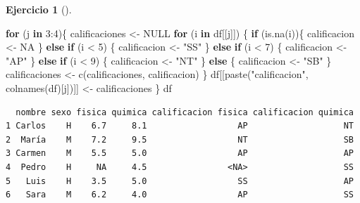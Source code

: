 \documentclass[
  a4paper,
]{scrreport}
\newenvironment{Shaded}{\begin{snugshade}}{\end{snugshade}}
\newcommand{\ConstantTok}[1]{\textcolor[rgb]{0.56,0.35,0.01}{#1}}
\newcommand{\ControlFlowTok}[1]{\textcolor[rgb]{0.00,0.23,0.31}{\textbf{#1}}}
\newcommand{\DecValTok}[1]{\textcolor[rgb]{0.68,0.00,0.00}{#1}}
\newcommand{\FunctionTok}[1]{\textcolor[rgb]{0.28,0.35,0.67}{#1}}
\newcommand{\NormalTok}[1]{\textcolor[rgb]{0.00,0.23,0.31}{#1}}
\newcommand{\OtherTok}[1]{\textcolor[rgb]{0.00,0.23,0.31}{#1}}
\newcommand{\SpecialCharTok}[1]{\textcolor[rgb]{0.37,0.37,0.37}{#1}}
\newcommand{\StringTok}[1]{\textcolor[rgb]{0.13,0.47,0.30}{#1}}
\theoremstyle{definition}
\newtheorem{exercise}{Ejercicio}[chapter]
\theoremstyle{definition}
\theoremstyle{remark}
\begin{document}
\begin{exercise}[]
\begin{enumerate}
\begin{tcolorbox}
\begin{Shaded}
\begin{Highlighting}[]
\ControlFlowTok{for}\NormalTok{ (j }\ControlFlowTok{in} \DecValTok{3}\SpecialCharTok{:}\DecValTok{4}\NormalTok{)\{}
\NormalTok{  calificaciones }\OtherTok{\textless{}{-}} \ConstantTok{NULL}
  \ControlFlowTok{for}\NormalTok{ (i }\ControlFlowTok{in}\NormalTok{ df[[j]]) \{}
    \ControlFlowTok{if}\NormalTok{ (}\FunctionTok{is.na}\NormalTok{(i))\{}
\NormalTok{      calificacion }\OtherTok{\textless{}{-}} \ConstantTok{NA} 
\NormalTok{    \} }\ControlFlowTok{else} \ControlFlowTok{if}\NormalTok{ (i }\SpecialCharTok{\textless{}} \DecValTok{5}\NormalTok{) \{}
\NormalTok{      calificacion }\OtherTok{\textless{}{-}} \StringTok{"SS"}
\NormalTok{    \} }\ControlFlowTok{else} \ControlFlowTok{if}\NormalTok{ (i }\SpecialCharTok{\textless{}} \DecValTok{7}\NormalTok{) \{}
\NormalTok{      calificacion }\OtherTok{\textless{}{-}} \StringTok{"AP"}
\NormalTok{    \} }\ControlFlowTok{else} \ControlFlowTok{if}\NormalTok{ (i }\SpecialCharTok{\textless{}} \DecValTok{9}\NormalTok{) \{}
\NormalTok{      calificacion }\OtherTok{\textless{}{-}} \StringTok{"NT"}
\NormalTok{    \} }\ControlFlowTok{else}\NormalTok{ \{}
\NormalTok{      calificacion }\OtherTok{\textless{}{-}} \StringTok{"SB"}
\NormalTok{    \}}
\NormalTok{    calificaciones }\OtherTok{\textless{}{-}} \FunctionTok{c}\NormalTok{(calificaciones, calificacion)}
\NormalTok{  \}}
\NormalTok{  df[[}\FunctionTok{paste}\NormalTok{(}\StringTok{"calificacion"}\NormalTok{, }\FunctionTok{colnames}\NormalTok{(df)[j])]] }\OtherTok{\textless{}{-}}\NormalTok{ calificaciones}
\NormalTok{\}}
\NormalTok{df}
\end{Highlighting}
\end{Shaded}

\begin{verbatim}
  nombre sexo fisica quimica calificacion fisica calificacion quimica
1 Carlos    H    6.7     8.1                  AP                   NT
2  María    M    7.2     9.5                  NT                   SB
3 Carmen    M    5.5     5.0                  AP                   AP
4  Pedro    H     NA     4.5                <NA>                   SS
5   Luis    H    3.5     5.0                  SS                   AP
6   Sara    M    6.2     4.0                  AP                   SS
\end{verbatim}

  \end{tcolorbox}
\end{enumerate}

\end{exercise}
\end{document}
